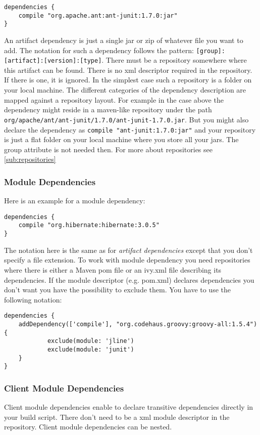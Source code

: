 \begin{Verbatim}
dependencies {
	compile "org.apache.ant:ant-junit:1.7.0:jar"
}
\end{Verbatim}

An artifact dependency is just a single jar or zip of whatever file you want to add. The notation for such a dependency follows the  pattern: \texttt{[group]:[artifact]:[version]:[type]}. There must be a repository somewhere where this artifact can be found. There is no xml descriptor required in the repository. If there is one, it is ignored. In the simplest case such a repository is a folder on your local machine. The different categories of the dependency description are mapped against a repository layout. For example in the case above the dependency might reside in a maven-like repository under the path \texttt{org/apache/ant/ant-junit/1.7.0/ant-junit-1.7.0.jar}. But you might also declare the dependency as \texttt{compile "ant-junit:1.7.0:jar"} and your repository is just a flat folder on your local machine where you store all your jars. The group attribute is not needed then. For more about repositories see \ref{sub:repositories}

\subsubsection{Module Dependencies} %
\label{ssub:module_dependencies}
Here is an example for a module dependency:

\begin{Verbatim}
dependencies {
	compile "org.hibernate:hibernate:3.0.5"
}
\end{Verbatim}

The notation here is the same as for \emph{artifact dependencies} except that you don't specify a file extension. To work with module dependency you need repositories where there is either a Maven pom file or an ivy.xml file describing its dependencies. If the module descriptor (e.g. pom.xml) declares dependencies you don't want you have the possibility to exclude them. You have to use the following notation:

\begin{Verbatim}
dependencies {
	addDependency(['compile'], "org.codehaus.groovy:groovy-all:1.5.4") {
	        exclude(module: 'jline')
	        exclude(module: 'junit')
	}
}
\end{Verbatim}


\subsubsection{Client Module Dependencies} %
\label{ssub:client_module_dependencies}
Client module dependencies enable to declare transitive dependencies directly in your build script. There don't need to be a xml module descriptor in the repository. Client module dependencies can be nested.

